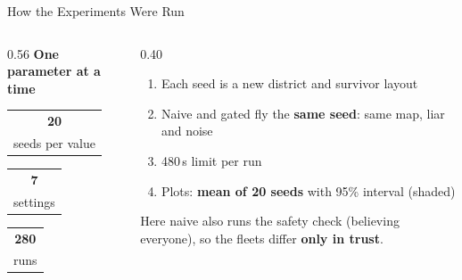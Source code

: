 \documentclass[aspectratio=169,10pt]{beamer}
\makeatletter
\newcommand{\stat}[2]{%
  \begin{tabular}{@{}c@{}}
    {\LARGE\bfseries\color{primary}#1}\\[-1pt]
    {\scriptsize #2}
  \end{tabular}}
\makeatother
\begin{document}
\begin{frame}{How the Experiments Were Run}
\begin{columns}[c]
\begin{column}{0.56\textwidth}
\centering
\textbf{One parameter at a time}\\[0.8em]

\vspace{1em}
\stat{20}{seeds per value} \hfill \stat{7}{settings} \hfill \stat{280}{runs}
\end{column}
\begin{column}{0.40\textwidth}
\begin{enumerate}\small
  \item Each seed is a new district and survivor layout
  \item Naive and gated fly the \textbf{same seed}: same map, liar and noise
  \item 480\,s limit per run
  \item Plots: \textbf{mean of 20 seeds} with 95\% interval (shaded)
\end{enumerate}
\vspace{0.4em}
{\footnotesize Here naive also runs the safety check (believing everyone), so the fleets differ \textbf{only in trust}.}
\end{column}
\end{columns}
\end{frame}
\end{document}
